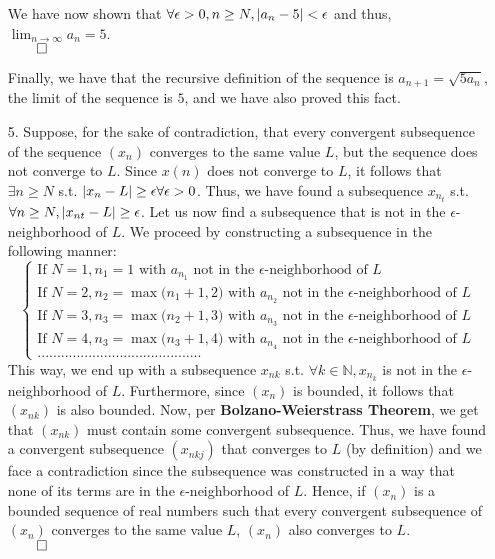 \documentclass[11pt]{article}
\DeclarePairedDelimiter\abs{\lvert}{\rvert}%
\newcommand{\nats}{\mathbb{N}}
\begin{document}
\begin{itemize}
            We have now shown that $\forall \epsilon > 0, n \geq N, \abs{a_n - 5}
            < \epsilon$ and thus, $\displaystyle\lim_{n \to \infty} a_n = 5$.\\
            $\qed$

            Finally, we have that the recursive definition of the sequence is
            $a_{n + 1} = \sqrt{5a_{n}}$, the limit of the sequence is $5$, and
            we have also proved this fact.

        \newpage
        \item[5.]
            Suppose, for the sake of contradiction, that every convergent
            subsequence of the sequence $(x_n)$ converges to the same value
            $L$, but the sequence does not converge to $L$. Since $x(n)$ does
            not converge to $L$, it follows that $\exists n \geq N$ s.t.
            $\abs{x_n - L} \geq \epsilon \forall \epsilon > 0$. Thus, we have
            found a subsequence $x_{n_t}$ s.t. $\forall n \geq N, \abs{x_{nt} -
            L} \geq \epsilon$. Let us now find a subsequence that is not in
            the $\epsilon$-neighborhood of $L$. We proceed by constructing a
            subsequence in the following manner:
            \begin{equation*}
                \begin{cases}
                    \text{If } N = 1, n_1 = 1                  \text{ with } a_{n_1} \text{ not in the $\epsilon$-neighborhood of } L\\
                    \text{If } N = 2, n_2 = \max{(n_1 + 1, 2}) \text{ with } a_{n_2} \text{ not in the $\epsilon$-neighborhood of } L\\
                    \text{If } N = 3, n_3 = \max{(n_2 + 1, 3}) \text{ with } a_{n_3} \text{ not in the $\epsilon$-neighborhood of } L\\
                    \text{If } N = 4, n_3 = \max{(n_3 + 1, 4}) \text{ with } a_{n_4} \text{ not in the $\epsilon$-neighborhood of } L\\
                    ..........................................
                \end{cases}
            \end{equation*}
            This way, we end up with a subsequence $x_{nk}$ s.t. $\forall k \in
            \nats, x_{n_k}$ is not in the $\epsilon$-neighborhood of $L$.
            Furthermore, since $(x_n)$ is bounded, it follows that $(x_{nk})$
            is also bounded. Now, per \textbf{Bolzano-Weierstrass Theorem}, we
            get that $(x_{nk})$ must contain some convergent subsequence. Thus,
            we have found a convergent subsequence $(x_{nkj})$ that converges
            to $L$ (by definition) and we face a contradiction since the
            subsequence was constructed in a way that none of its terms are in
            the $\epsilon$-neighborhood of $L$. Hence, if $(x_n)$ is a bounded
            sequence of real numbers such that every convergent subsequence of
            $(x_n)$ converges to the same value $L$, $(x_n)$ also converges to
            $L$.\\
            $\qed$


\end{itemize}
\end{document}
